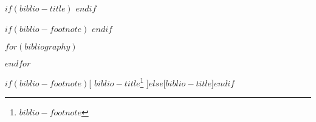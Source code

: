 \renewcommand{\anexos}{
  \cftinserthook{toc}{appendixhook}
  \PRIVATEannexconfig{\anexoname}{\anexosname}
  \appendix
  \renewcommand\theHchapter{anexochapback.\arabic{chapter}}
  \chapterstyle{apendice}
}

\renewenvironment{anexosenv}{
  \cftinserthook{toc}{appendixhook}
  \PRIVATEannexconfig{\anexoname}{\anexosname}
  \begin{appendix}
  \renewcommand\theHchapter{anexochapback.\arabic{chapter}}
  \chapterstyle{apendice}
}{
  \end{appendix}
  \setboolean{abntex@apendiceousecao}{false}
  \bookmarksetup{startatroot}
}

$if(biblio-title)$
\renewcommand{\bibname}{$biblio-title$}
\newcommand{\newbibname}{$biblio-title$}
$endif$

$if(biblio-footnote)$
\newcommand{\bibnamewithfootnote}{
  $biblio-title$\protect\footnote{$biblio-footnote$}
}
$endif$

\usepackage[
$if(biblio-style)$style=$biblio-style$,$endif$$for(biblatexoptions)$$biblatexoptions$$sep$,$endfor$]{biblatex}
\usepackage{csquotes}
$for(bibliography)$

$endfor$



$if(biblio-footnote)$[\bibnamewithfootnote]$else$[\newbibname]$endif${
}

\AtBeginBibliography{\vspace{4em}}
\renewcommand{\bibfont}{\ABNTEXfontereduzida}

